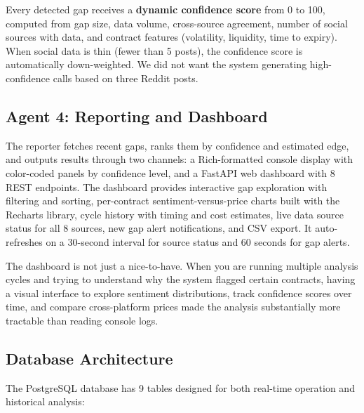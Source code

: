 \documentclass[conference]{IEEEtran}
\begin{document}
Every detected gap receives a \textbf{dynamic confidence score} from 0 to 100, computed from gap size, data volume, cross-source agreement, number of social sources with data, and contract features (volatility, liquidity, time to expiry). When social data is thin (fewer than 5 posts), the confidence score is automatically down-weighted. We did not want the system generating high-confidence calls based on three Reddit posts.

\subsection{Agent 4: Reporting and Dashboard}

The reporter fetches recent gaps, ranks them by confidence and estimated edge, and outputs results through two channels: a Rich-formatted console display with color-coded panels by confidence level, and a FastAPI web dashboard with 8 REST endpoints. The dashboard provides interactive gap exploration with filtering and sorting, per-contract sentiment-versus-price charts built with the Recharts library, cycle history with timing and cost estimates, live data source status for all 8 sources, new gap alert notifications, and CSV export. It auto-refreshes on a 30-second interval for source status and 60 seconds for gap alerts.

The dashboard is not just a nice-to-have. When you are running multiple analysis cycles and trying to understand why the system flagged certain contracts, having a visual interface to explore sentiment distributions, track confidence scores over time, and compare cross-platform prices made the analysis substantially more tractable than reading console logs.

\subsection{Database Architecture}

The PostgreSQL database has 9 tables designed for both real-time operation and historical analysis:
\end{document}
